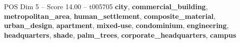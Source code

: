 \begin{textsample}{POS Dim 5 – Score 14.00 – t005705}  \label{ex:f5_pos_040}
\textbf{city}, \textbf{commercial\_building}, \textbf{metropolitan\_area}, \textbf{human\_settlement}, \textbf{composite\_material}, \textbf{urban\_design}, \textbf{apartment}, \textbf{mixed-use}, \textbf{condominium}, \textbf{engineering}, \textbf{headquarters}, \textbf{shade}, \textbf{palm\_trees}, \textbf{corporate\_headquarters}, \textbf{campus}

\end{textsample}
